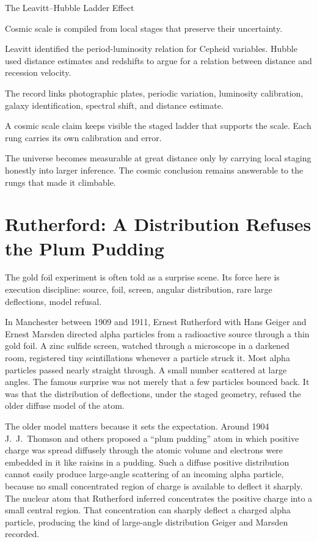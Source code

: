 \begin{phenom}{The Leavitt--Hubble Ladder Effect~\cite{hubble1929,leavitt1912}}
\label{ph:leavitt-hubble-ladder}

\PhStatement
Cosmic scale is compiled from local stages that preserve their uncertainty.

\PhOrigin
Leavitt identified the period-luminosity relation for Cepheid variables.
Hubble used distance estimates and redshifts to argue for a relation between
distance and recession velocity.

\PhObservation
The record links photographic plates, periodic variation, luminosity
calibration, galaxy identification, spectral shift, and distance estimate.

\PhConstraint
A cosmic scale claim keeps visible the staged ladder that supports the scale.
Each rung carries its own calibration and error.

\PhConsequence
The universe becomes measurable at great distance only by carrying local
staging honestly into larger inference. The cosmic conclusion remains
answerable to the rungs that made it climbable.
\end{phenom}

\section{Rutherford: A Distribution Refuses the Plum Pudding}

The gold foil experiment is often told as a surprise scene. Its force here
is execution discipline: source, foil, screen, angular distribution, rare
large deflections, model refusal.

In Manchester between 1909 and 1911, Ernest Rutherford with Hans Geiger and
Ernest Marsden directed alpha particles from a radioactive source through a
thin gold foil. A zinc sulfide screen, watched through a microscope in a
darkened room, registered tiny scintillations whenever a particle struck it.
Most alpha particles passed nearly straight through. A small number
scattered at large angles. The famous surprise was not merely that a few
particles bounced back. It was that the distribution of deflections, under
the staged geometry, refused the older diffuse model of the atom.

The older model matters because it sets the expectation. Around 1904 J.~J.~Thomson and others
proposed a ``plum pudding'' atom in which positive charge was spread
diffusely through the atomic volume and electrons were embedded in it like
raisins in a pudding. Such a diffuse positive distribution cannot easily
produce large-angle scattering of an incoming alpha particle, because no
small concentrated region of charge is available to deflect it sharply. The
nuclear atom that Rutherford inferred concentrates the positive charge into
a small central region. That concentration can sharply deflect a charged alpha particle, producing the
kind of large-angle distribution Geiger and Marsden recorded.


